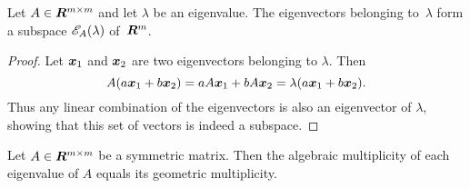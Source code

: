 \begin{lemma}\label{lemma:eigenspace}
Let $A \in \bm{R}^{m \times m}$ and let $\lambda$ be an eigenvalue.
The eigenvectors belonging to~$\lambda$ form a subspace $\mathscr{E}_{A}(\lambda)$
of~$\bm{R}^m$.
\end{lemma}
\begin{proof}
Let $\boldsymbol{x}_1$ and $\boldsymbol{x}_2$ are two eigenvectors belonging to $\lambda$.
Then
\[
    A (a \boldsymbol{x}_1 + b \boldsymbol{x}_2) =
        a A \boldsymbol{x}_1 + b A \boldsymbol{x}_2 =
        \lambda (a \boldsymbol{x}_1 + b \boldsymbol{x}_2).
\]
Thus any linear combination of the eigenvectors is also an eigenvector of $\lambda$,
showing that this set of vectors is indeed a subspace.
\end{proof}

\begin{lemma}\label{lemma:alg_geom_mult}
Let $A \in \bm{R}^{m \times m}$ be a symmetric matrix. Then the algebraic multiplicity
of each eigenvalue of $A$ equals its geometric multiplicity.
\end{lemma}
